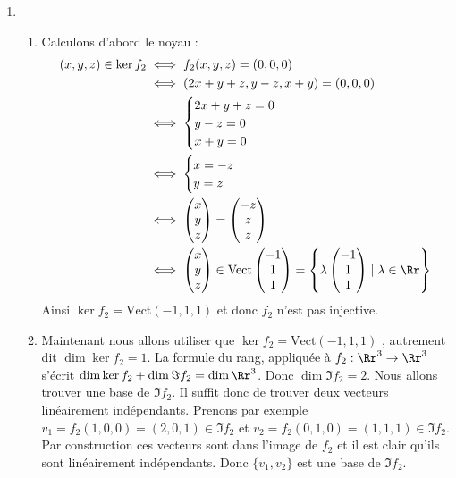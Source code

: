 {{\begin{enumerate}
  \item 
\begin{enumerate}
  \item Calculons d'abord le noyau :
\begin{align*}
(x,y,z) \in \ker f_2
  & \iff f_2(x,y,z) = (0,0,0) \\
  & \iff (2x+y+z,y-z,x+y) = (0,0,0) \\
  &\iff \begin{cases}
         2x+y+z = 0 \\
         y-z = 0 \\   
         x+y = 0 \\ 
        \end{cases} \\
  & \iff  \begin{cases}
         x = -z \\
         y = z \\   
        \end{cases} \\
  & \iff 
  \begin{pmatrix}x\\y\\z\end{pmatrix} = \begin{pmatrix}-z\\z\\z\end{pmatrix}\\ 
  &\iff 
  \begin{pmatrix}x\\y\\z\end{pmatrix} \in 
  \text{Vect} \begin{pmatrix}-1\\1\\1\end{pmatrix} 
  = \left\lbrace \lambda\begin{pmatrix}-1\\1\\1\end{pmatrix} \mid \lambda \in \Rr \right\rbrace\\ 
\end{align*}
Ainsi $\ker f_2 =  \text{Vect}(-1,1,1) $ et donc $f_2$ n'est pas injective.

  \item Maintenant nous allons utiliser que $\ker f_2 = \text{Vect}(-1,1,1)$ , autrement dit
$\dim  \ker f_2 = 1$.
La formule du rang, appliquée à $f_2 : \Rr^3 \to \Rr^3$ s'écrit 
$\dim \ker f_2 + \dim \Im f_2 = \dim \Rr^3$. Donc $\dim \Im f_2 = 2$.
Nous allons trouver une base de $\Im f_2$. Il suffit donc de trouver deux vecteurs linéairement indépendants.
Prenons par exemple
$v_1 = f_2(1,0,0) =  (2,0,1) \in\Im f_2$
et $v_2 = f_2(0,1,0) = (1,1,1) \in \Im f_2$. Par construction ces vecteurs sont dans l'image de $f_2$ et 
il est clair qu'ils sont linéairement indépendants. Donc $\{v_1,v_2\}$ est une base de $\Im f_2$.


\end{enumerate}
\end{enumerate}}}
